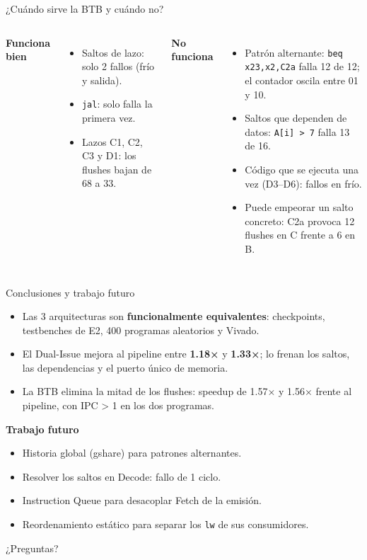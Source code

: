 \documentclass[aspectratio=169,10pt]{beamer}
\newcommand{\sig}[1]{\texttt{#1}}
\begin{document}
\begin{frame}{¿Cuándo sirve la BTB y cuándo no?}
\begin{columns}[T]
\textbf{Funciona bien}
\begin{itemize}
  \item Saltos de lazo: solo 2 fallos (frío y salida).
  \item \sig{jal}: solo falla la primera vez.
  \item Lazos C1, C2, C3 y D1: los flushes bajan de 68 a 33.
\end{itemize}
\textbf{No funciona}
\begin{itemize}
  \item \alert{Patrón alternante}: \sig{beq x23,x2,C2a} falla 12 de 12; el contador oscila entre 01 y 10.
  \item Saltos que dependen de datos: \sig{A[i] > 7} falla 13 de 16.
  \item Código que se ejecuta una vez (D3–D6): fallos en frío.
  \item \alert{Puede empeorar un salto concreto}: C2a provoca 12 flushes en C frente a 6 en B.
\end{itemize}
\end{columns}
\end{frame}

\begin{frame}{Conclusiones y trabajo futuro}
\begin{itemize}
  \item Las 3 arquitecturas son \textbf{funcionalmente equivalentes}: checkpoints, testbenches de E2, 400 programas aleatorios y Vivado.
  \item El Dual-Issue mejora al pipeline entre \textbf{1.18×} y \textbf{1.33×}; lo frenan los saltos, las dependencias y el puerto único de memoria.
  \item La BTB elimina la mitad de los flushes: \alert{speedup de 1.57× y 1.56×} frente al pipeline, con \alert{IPC > 1} en los dos programas.
\end{itemize}
\vspace{4pt}
\textbf{Trabajo futuro}
\begin{itemize}
  \item Historia global (gshare) para patrones alternantes.
  \item Resolver los saltos en Decode: fallo de 1 ciclo.
  \item Instruction Queue para desacoplar Fetch de la emisión.
  \item Reordenamiento estático para separar los \sig{lw} de sus consumidores.
\end{itemize}
\end{frame}

\begin{frame}[standout]
¿Preguntas?
\end{frame}
\end{document}
